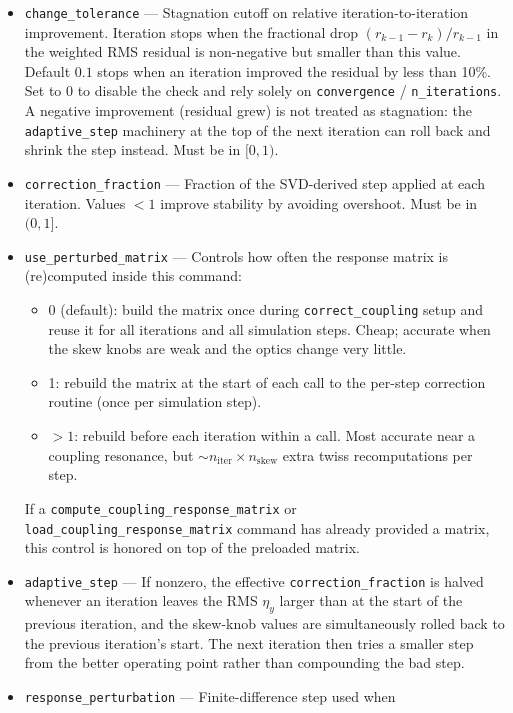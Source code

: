 \documentclass[11pt]{article}
\begin{document}
\begin{itemize}
  at the BPMs falls below this value (in meters).
\item \verb|change_tolerance| --- Stagnation cutoff on relative
  iteration-to-iteration improvement.  Iteration stops when the
  fractional drop $(r_{k-1} - r_k)/r_{k-1}$ in the weighted RMS residual
  is non-negative but smaller than this value.  Default $0.1$ stops
  when an iteration improved the residual by less than 10\%.  Set to 0
  to disable the check and rely solely on \verb|convergence| /
  \verb|n_iterations|.  A negative improvement (residual grew) is not
  treated as stagnation: the \verb|adaptive_step| machinery at the top
  of the next iteration can roll back and shrink the step instead.
  Must be in $[0, 1)$.
\item \verb|correction_fraction| --- Fraction of the SVD-derived step
  applied at each iteration.  Values $<1$ improve stability by avoiding
  overshoot. Must be in $(0,1]$.
\item \verb|use_perturbed_matrix| --- Controls how often the response
  matrix is (re)computed inside this command:
  \begin{itemize}
  \item 0 (default): build the matrix once during \verb|correct_coupling|
    setup and reuse it for all iterations and all simulation steps.  Cheap;
    accurate when the skew knobs are weak and the optics change very little.
  \item 1: rebuild the matrix at the start of each call to the per-step
    correction routine (once per simulation step).
  \item $>1$: rebuild before each iteration within a call.  Most accurate
    near a coupling resonance, but $\sim n_{\mathrm{iter}} \times n_{\mathrm{skew}}$
    extra twiss recomputations per step.
  \end{itemize}
  If a \verb|compute_coupling_response_matrix| or
  \verb|load_coupling_response_matrix| command has already provided a
  matrix, this control is honored on top of the preloaded matrix.
\item \verb|adaptive_step| --- If nonzero, the effective
  \verb|correction_fraction| is halved whenever an iteration leaves the
  RMS $\eta_y$ larger than at the start of the previous iteration, and the
  skew-knob values are simultaneously rolled back to the previous
  iteration's start.  The next iteration then tries a smaller step from
  the better operating point rather than compounding the bad step.
\item \verb|response_perturbation| --- Finite-difference step used when

\end{itemize}
\end{document}
